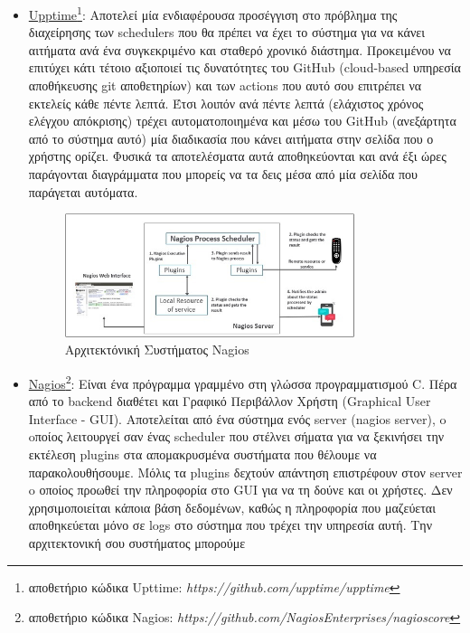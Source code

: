 \begin{itemize}
	\item \href{https://github.com/upptime/upptime}{Upptime\footnote{αποθετήριο κώδικα Upttime: \textit{https://github.com/upptime/upptime}}}: Αποτελεί μία ενδιαφέρουσα προσέγγιση στο πρόβλημα
	      της διαχείρησης των schedulers που θα πρέπει να έχει το σύστημα για να κάνει αιτήματα ανά ένα συγκεκριμένο
	      και σταθερό χρονικό διάστημα. Προκειμένου να επιτύχει κάτι τέτοιο αξιοποιεί τις δυνατότητες του GitHub (cloud-based υπηρεσία αποθήκευσης git αποθετηρίων)
	      και των actions που αυτό σου επιτρέπει να εκτελείς κάθε πέντε λεπτά. Έτσι λοιπόν ανά πέντε λεπτά (ελάχιστος χρόνος ελέγχου απόκρισης)
	      τρέχει αυτοματοποιημένα και μέσω του GitHub (ανεξάρτητα από το σύστημα αυτό) μία διαδικασία που κάνει αιτήματα στην σελίδα που ο χρήστης ορίζει.
	      Φυσικά τα αποτελέσματα αυτά αποθηκεύονται και ανά έξι ώρες παράγονται διαγράμματα που μπορείς να τα δεις μέσα από μία σελίδα που παράγεται αυτόματα.
	      \begin{figure}[!ht]
		      \centering
		      \includegraphics[width=0.8\textwidth]{./images/chapter3/nagios.jpg}
		      \caption[Αρχιτεκτόνική Συστήματος Nagios]{Αρχιτεκτόνική Συστήματος Nagios}
		      \label{fig:nagios}
	      \end{figure}
	\item \href{https://github.com/NagiosEnterprises/nagioscore}{Nagios\footnote{αποθετήριο κώδικα Nagios: \textit{https://github.com/NagiosEnterprises/nagioscore}}}: Είναι ένα πρόγραμμα γραμμένο στη γλώσσα προγραμματισμού
	      C. Πέρα από το backend διαθέτει και Γραφικό Περιβάλλον Χρήστη (Graphical User Interface - GUI).
	      Αποτελείται από ένα σύστημα ενός server (nagios server), o oποίος λειτουργεί σαν ένας scheduler που στέλνει σήματα
	      για να ξεκινήσει την εκτέλεση plugins στα απομακρυσμένα συστήματα που θέλουμε να παρακολουθήσουμε. Μόλις τα plugins δεχτούν
	      απάντηση επιστρέφουν στον server o οποίος προωθεί την πληροφορία στο GUI για να τη δούνε και οι χρήστες. Δεν χρησιμοποιείται κάποια βάση
	      δεδομένων, καθώς η πληροφορία που μαζεύεται αποθηκεύεται μόνο σε logs στο σύστημα που τρέχει την υπηρεσία αυτή. Την αρχιτεκτονική σου συστήματος μπορούμε

\end{itemize}
